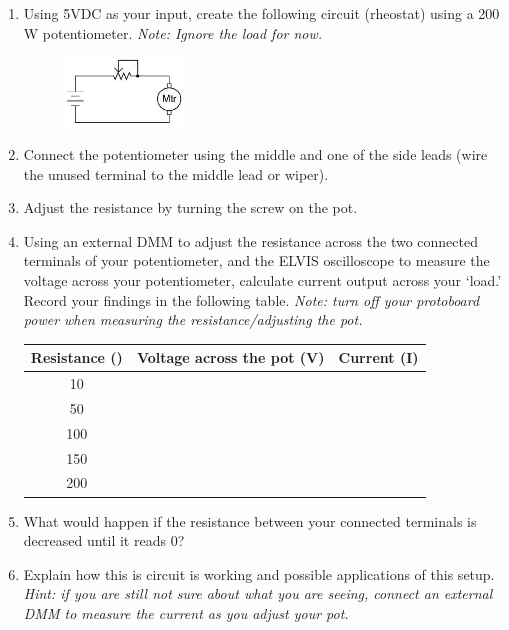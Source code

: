 \documentclass{article}
\begin{document}
\begin{enumerate}
	\item Using 5VDC as your input, create the following circuit (rheostat) using a 200 W potentiometer. \textit{Note: Ignore the load for now.}
		\begin{figure}[h!]
    	\includegraphics[width=0.3\textwidth]{lab_1_fig_5.jpg}
    	\centering
		\end{figure}
	\item Connect the potentiometer using the middle and one of the side leads (wire the unused terminal to the middle lead or wiper).
	\item Adjust the resistance by turning the screw on the pot.
	\item Using an external DMM to adjust the resistance across the two connected terminals of your potentiometer, and the ELVIS oscilloscope to measure the voltage across your potentiometer, calculate current output across your ‘load.’ Record your findings in the following table. \textit{Note: turn off your protoboard power when measuring the resistance/adjusting the pot.}
		
		\begin{table}[h!]
		\centering
		\begin{tabular}[h!]{c|c|c}
		\toprule
		Resistance (\textOmega) & Voltage across the pot (V) & Current (I) \\
		\midrule
		10 & &\\
		\midrule
		50 & &\\
		\midrule
		100 & &\\
		\midrule
		150 & &\\
		\midrule
		200 & &\\
		\bottomrule
		\end{tabular}
		\end{table}

	\item What would happen if the resistance between your connected terminals is decreased until it reads 0\textOmega?
	\item Explain how this is circuit is working and possible applications of this setup. \textit{Hint: if you are still not sure about what you are seeing, connect an external DMM to measure the current as you adjust your pot.}
\end{enumerate}
\end{document}
